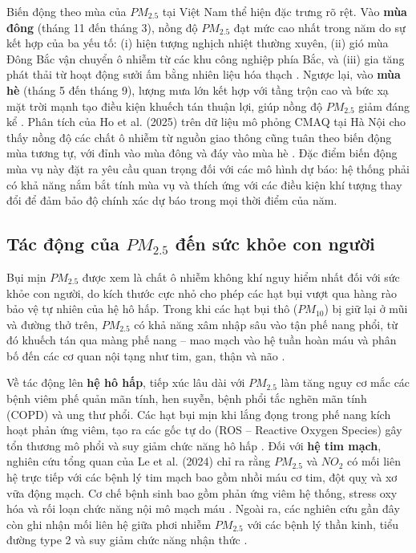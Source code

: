 Biến động theo mùa của $PM_{2.5}$ tại Việt Nam thể hiện đặc trưng rõ rệt. Vào \textbf{mùa đông} (tháng 11 đến tháng 3), nồng độ $PM_{2.5}$ đạt mức cao nhất trong năm do sự kết hợp của ba yếu tố: (i) hiện tượng nghịch nhiệt thường xuyên, (ii) gió mùa Đông Bắc vận chuyển ô nhiễm từ các khu công nghiệp phía Bắc, và (iii) gia tăng phát thải từ hoạt động sưởi ấm bằng nhiên liệu hóa thạch \cite{dam2024pm25, ho2025assessment}. Ngược lại, vào \textbf{mùa hè} (tháng 5 đến tháng 9), lượng mưa lớn kết hợp với tầng trộn cao và bức xạ mặt trời mạnh tạo điều kiện khuếch tán thuận lợi, giúp nồng độ $PM_{2.5}$ giảm đáng kể \cite{dam2024pm25}. Phân tích của Ho et al. (2025) trên dữ liệu mô phỏng CMAQ tại Hà Nội cho thấy nồng độ các chất ô nhiễm từ nguồn giao thông cũng tuân theo biến động mùa tương tự, với đỉnh vào mùa đông và đáy vào mùa hè \cite{ho2025assessment}. Đặc điểm biến động mùa vụ này đặt ra yêu cầu quan trọng đối với các mô hình dự báo: hệ thống phải có khả năng nắm bắt tính mùa vụ và thích ứng với các điều kiện khí tượng thay đổi để đảm bảo độ chính xác dự báo trong mọi thời điểm của năm.

\subsection{Tác động của $PM_{2.5}$ đến sức khỏe con người}

Bụi mịn $PM_{2.5}$ được xem là chất ô nhiễm không khí nguy hiểm nhất đối với sức khỏe con người, do kích thước cực nhỏ cho phép các hạt bụi vượt qua hàng rào bảo vệ tự nhiên của hệ hô hấp. Trong khi các hạt bụi thô ($PM_{10}$) bị giữ lại ở mũi và đường thở trên, $PM_{2.5}$ có khả năng xâm nhập sâu vào tận phế nang phổi, từ đó khuếch tán qua màng phế nang -- mao mạch vào hệ tuần hoàn máu và phân bố đến các cơ quan nội tạng như tim, gan, thận và não \cite{le2024environmental}. 

Về tác động lên \textbf{hệ hô hấp}, tiếp xúc lâu dài với $PM_{2.5}$ làm tăng nguy cơ mắc các bệnh viêm phế quản mãn tính, hen suyễn, bệnh phổi tắc nghẽn mãn tính (COPD) và ung thư phổi. Các hạt bụi mịn khi lắng đọng trong phế nang kích hoạt phản ứng viêm, tạo ra các gốc tự do (ROS -- Reactive Oxygen Species) gây tổn thương mô phổi và suy giảm chức năng hô hấp \cite{le2024environmental}. Đối với \textbf{hệ tim mạch}, nghiên cứu tổng quan của Le et al. (2024) chỉ ra rằng $PM_{2.5}$ và $NO_2$ có mối liên hệ trực tiếp với các bệnh lý tim mạch bao gồm nhồi máu cơ tim, đột quỵ và xơ vữa động mạch. Cơ chế bệnh sinh bao gồm phản ứng viêm hệ thống, stress oxy hóa và rối loạn chức năng nội mô mạch máu \cite{le2024environmental}. Ngoài ra, các nghiên cứu gần đây còn ghi nhận mối liên hệ giữa phơi nhiễm $PM_{2.5}$ với các bệnh lý thần kinh, tiểu đường type 2 và suy giảm chức năng nhận thức \cite{krzyzanowski2014megacities}.

